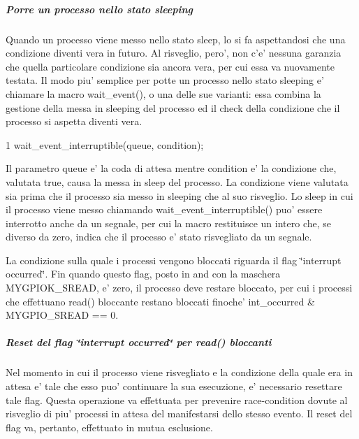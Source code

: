 \subparagraph*{Porre un processo nello stato sleeping}

Quando un processo viene messo nello stato sleep, lo si fa aspettandosi che una condizione diventi vera in futuro. Al risveglio, pero', non c'e' nessuna garanzia che quella particolare condizione sia ancora vera, per cui essa va nuovamente testata. Il modo piu' semplice per potte un processo nello stato sleeping e' chiamare la macro wait\+\_\+event(), o una delle sue varianti\+: essa combina la gestione della messa in sleeping del processo ed il check della condizione che il processo si aspetta diventi vera. 
\begin{DoxyCode}
1 wait\_event\_interruptible(queue, condition);
\end{DoxyCode}
 Il parametro queue e' la coda di attesa mentre condition e' la condizione che, valutata true, causa la messa in sleep del processo. La condizione viene valutata sia prima che il processo sia messo in sleeping che al suo risveglio. Lo sleep in cui il processo viene messo chiamando wait\+\_\+event\+\_\+interruptible() puo' essere interrotto anche da un segnale, per cui la macro restituisce un intero che, se diverso da zero, indica che il processo e' stato risvegliato da un segnale.

La condizione sulla quale i processi vengono bloccati riguarda il flag \char`\"{}interrupt occurred\char`\"{}. Fin quando questo flag, posto in and con la maschera M\+Y\+G\+P\+I\+O\+K\+\_\+\+S\+R\+E\+A\+D, e' zero, il processo deve restare bloccato, per cui i processi che effettuano read() bloccante restano bloccati finoche' int\+\_\+occurred \& M\+Y\+G\+P\+I\+O\+\_\+\+S\+R\+E\+A\+D == 0.

\subparagraph*{Reset del flag \char`\"{}interrupt occurred\char`\"{} per read() bloccanti}

Nel momento in cui il processo viene risvegliato e la condizione della quale era in attesa e' tale che esso puo' continuare la sua esecuzione, e' necessario resettare tale flag. Questa operazione va effettuata per prevenire race-\/condition dovute al risveglio di piu' processi in attesa del manifestarsi dello stesso evento. Il reset del flag va, pertanto, effettuato in mutua esclusione.


